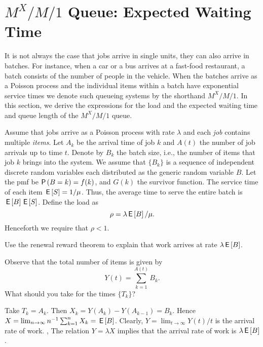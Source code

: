\section
{$M^X/M/1$ Queue: Expected Waiting Time}
\label{sec:mxm1-queue:-expected}



It is not always the case that jobs arrive in single units, they can also arrive in batches.
For instance, when a car or a bus arrives at a fast-food restaurant, a batch consists of the number of people in the vehicle.
When the batches arrive as a Poisson process and the individual items within a batch have exponential service times we denote such queueing systems by the shorthand $M^X/M/1$.
In this section, we derive the expressions for the load and the expected waiting time and queue length of the $M^X/M/1$ queue.


Assume that jobs arrive as a Poisson process with rate $\lambda$ and each \emph{job} contains multiple \emph{items}.
Let $A_k$ be the arrival time of job $k$ and $A(t)$ the number of job arrivals up to time $t$.
Denote by $B_k$ the batch size, i.e., the number of items that job $k$ brings into the system.
We assume that $\{B_k\}$ is a sequence of independent discrete random variables each distributed as the generic random variable $B$.
Let the pmf be $\P{B = k} = f(k)$, and $G(k)$ the survivor function.
The service time of each item $\,\mathsf{E}\left[S\right] = 1/\mu$.
Thus, the average time to serve the entire batch is $\,\mathsf{E}\left[B\right] \,\mathsf{E}\left[S\right]$.
 Define the load as
\begin{equation*}
\rho = \lambda \,\mathsf{E}\left[B\right]/\mu.
\end{equation*}
Henceforth we require that $\rho< 1$.


\begin{exercise} 
Use the renewal reward theorem to explain that work arrives at rate $\lambda \,\mathsf{E}\left[B\right]$.
\begin{hint}
Observe that the total number of items is given by
\begin{equation*}
Y(t)= \sum_{k=1}^{A(t)} B_k.
\end{equation*}
What should you take for the times $\{T_k\}$? 
\end{hint}
\begin{solution}
Take $T_k = A_k$. Then $X_k = Y(A_k) - Y(A_{k-1}) = B_k$. Hence $X = \lim_{n\to\infty} n^{-1} \sum_{k=1}^n X_k = \,\mathsf{E}\left[B\right]$. Clearly, $Y = \lim_{t\to\infty} Y(t)/t$ is the arrival rate of work. , The relation $Y=\lambda X$ implies that the arrival rate of work is $\lambda \,\mathsf{E}\left[B\right]$. 
\end{solution}
\end{exercise}


